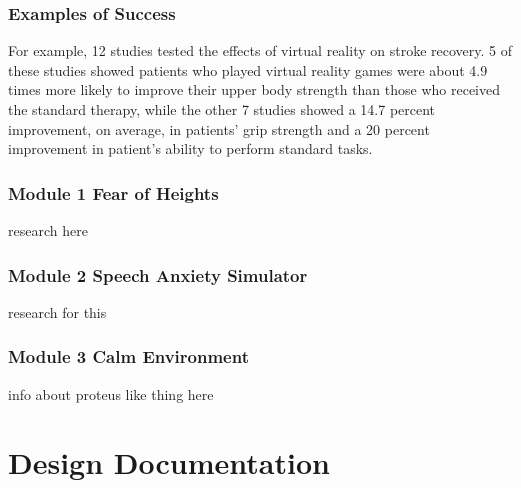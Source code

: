 \documentclass[a4paper,10pt]{article}
\begin{document}
\subsubsection{Examples of Success}
For example, 12 studies tested the effects of virtual reality on stroke recovery. 5 of these studies showed patients who played virtual reality games were about 4.9 times more likely to improve their upper body strength than those who received the standard therapy, while the other 7  studies showed a 14.7 percent improvement, on average, in patients' grip strength and a 20 percent improvement in patient's ability to perform standard tasks.\cite{stroke1}
\pagebreak
\subsubsection{Module 1 Fear of Heights}
research here
\pagebreak
\subsubsection{Module 2 Speech Anxiety Simulator}
research for this
\pagebreak
\subsubsection{Module 3 Calm Environment}
info about proteus like thing here 
\pagebreak
\section{Design Documentation}
\end{document}
